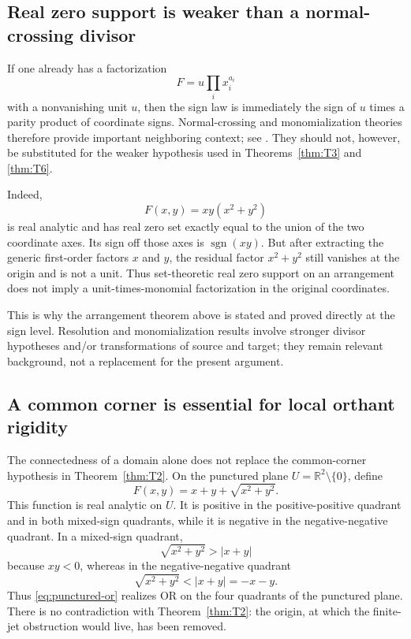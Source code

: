 \documentclass[11pt]{article}
\theoremstyle{definition}
\theoremstyle{remark}
\newcommand{\R}{\mathbb{R}}
\newcommand{\sign}{\operatorname{sgn}}
\begin{document}
\subsection{Real zero support is weaker than a normal-crossing divisor}

If one already has a factorization
\[
 F=u\prod_i x_i^{a_i}
\]
with a nonvanishing unit $u$, then the sign law is immediately the sign of $u$ times a parity product of coordinate signs. Normal-crossing and monomialization theories therefore provide important neighboring context; see \cite{BierstoneMilman2004,BelottoBierstone2023}. They should not, however, be substituted for the weaker hypothesis used in Theorems~\ref{thm:T3} and \ref{thm:T6}.

Indeed,
\begin{equation}\label{eq:weak-support-example}
 F(x,y)=xy(x^2+y^2)
\end{equation}
is real analytic and has real zero set exactly equal to the union of the two coordinate axes. Its sign off those axes is $\sign(xy)$. But after extracting the generic first-order factors $x$ and $y$, the residual factor $x^2+y^2$ still vanishes at the origin and is not a unit. Thus set-theoretic real zero support on an arrangement does not imply a unit-times-monomial factorization in the original coordinates.

This is why the arrangement theorem above is stated and proved directly at the sign level. Resolution and monomialization results involve stronger divisor hypotheses and/or transformations of source and target; they remain relevant background, not a replacement for the present argument.

\subsection{A common corner is essential for local orthant rigidity}

The connectedness of a domain alone does not replace the common-corner hypothesis in Theorem~\ref{thm:T2}. On the punctured plane $U=\R^2\setminus\{0\}$, define
\begin{equation}\label{eq:punctured-or}
 F(x,y)=x+y+\sqrt{x^2+y^2}.
\end{equation}
This function is real analytic on $U$. It is positive in the positive-positive quadrant and in both mixed-sign quadrants, while it is negative in the negative-negative quadrant. In a mixed-sign quadrant,
\[
 \sqrt{x^2+y^2}>|x+y|
\]
because $xy<0$, whereas in the negative-negative quadrant
\[
 \sqrt{x^2+y^2}<|x+y|=-x-y.
\]
Thus \eqref{eq:punctured-or} realizes OR on the four quadrants of the punctured plane. There is no contradiction with Theorem~\ref{thm:T2}: the origin, at which the finite-jet obstruction would live, has been removed.
\end{document}
